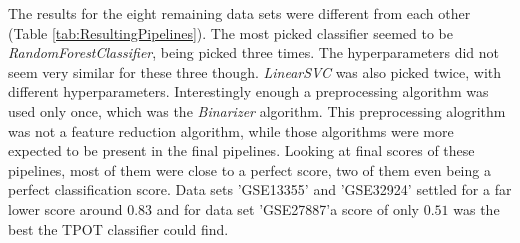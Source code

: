\documentclass[10pt,a4paper]{article}
\begin{document}
	The results for the eight remaining data sets were different from each other (Table \ref{tab:ResultingPipelines}). The most picked classifier seemed to be \textit{RandomForestClassifier}, being picked three times. The hyperparameters did not seem very similar for these three though. \textit{LinearSVC} was also picked twice, with different hyperparameters. Interestingly enough a preprocessing algorithm was used only once, which was the \textit{Binarizer} algorithm. This preprocessing alogrithm was not a feature reduction algorithm, while those algorithms were more expected to be present in the final pipelines. Looking at final scores of these pipelines, most of them were close to a perfect score, two of them even being a perfect classification score. Data sets 'GSE13355' and 'GSE32924' settled for a far lower score around $0.83$ and for data set 'GSE27887'a score of only $0.51$ was the best the TPOT classifier could find.
\end{document}
